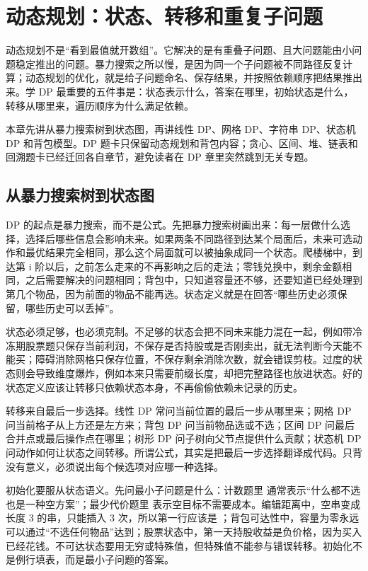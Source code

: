 \chapter{动态规划：状态、转移和重复子问题}

动态规划不是“看到最值就开数组”。它解决的是有重叠子问题、且大问题能由小问题稳定推出的问题。暴力搜索之所以慢，是因为同一个子问题被不同路径反复计算；动态规划的优化，就是给子问题命名、保存结果，并按照依赖顺序把结果推出来。学 DP 最重要的五件事是：状态表示什么，答案在哪里，初始状态是什么，转移从哪里来，遍历顺序为什么满足依赖。

本章先讲从暴力搜索树到状态图，再讲线性 DP、网格 DP、字符串 DP、状态机 DP 和背包模型。DP 题卡只保留动态规划和背包内容；贪心、区间、堆、链表和回溯题卡已经迁回各自章节，避免读者在 DP 章里突然跳到无关专题。

\section{从暴力搜索树到状态图}

DP 的起点是暴力搜索，而不是公式。先把暴力搜索树画出来：每一层做什么选择，选择后哪些信息会影响未来。如果两条不同路径到达某个局面后，未来可选动作和最优结果完全相同，那么这个局面就可以被抽象成同一个状态。爬楼梯中，到达第 i 阶以后，之前怎么走来的不再影响之后的走法；零钱兑换中，剩余金额相同，之后需要解决的问题相同；背包中，只知道容量还不够，还要知道已经处理到第几个物品，因为前面的物品不能再选。状态定义就是在回答“哪些历史必须保留，哪些历史可以丢掉”。

状态必须足够，也必须克制。不足够的状态会把不同未来能力混在一起，例如带冷冻期股票题只保存当前利润，不保存是否持股或是否刚卖出，就无法判断今天能不能买；障碍消除网格只保存位置，不保存剩余消除次数，就会错误剪枝。过度的状态则会导致维度爆炸，例如本来只需要前缀长度，却把完整路径也放进状态。好的状态定义应该让转移只依赖状态本身，不再偷偷依赖未记录的历史。

转移来自最后一步选择。线性 DP 常问当前位置的最后一步从哪里来；网格 DP 问当前格子从上方还是左方来；背包 DP 问当前物品选或不选；区间 DP 问最后合并点或最后操作点在哪里；树形 DP 问子树向父节点提供什么贡献；状态机 DP 问动作如何让状态之间转移。所谓公式，其实是把最后一步选择翻译成代码。只背  没有意义，必须说出每个候选项对应哪一种选择。

初始化要服从状态语义。先问最小子问题是什么：计数题里  通常表示“什么都不选也是一种空方案”；最少代价题里  表示空目标不需要成本。编辑距离中，空串变成长度 3 的串，只能插入 3 次，所以第一行应该是 ；背包可达性中，容量为零永远可以通过“不选任何物品”达到；股票状态中，第一天持股收益是负价格，因为买入已经花钱。不可达状态要用无穷或特殊值，但特殊值不能参与错误转移。初始化不是例行填表，而是最小子问题的答案。

